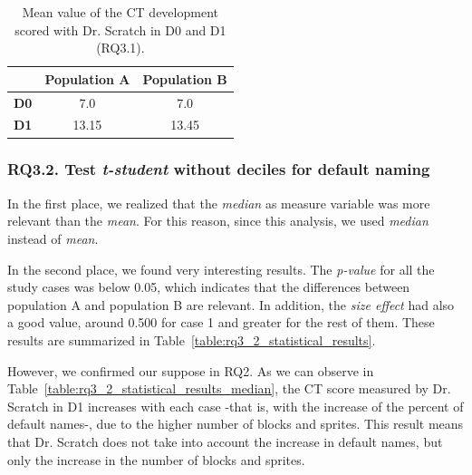 \begin{table}
 \begin{center}
  \begin{tabular}{|c|c|c|}
    \hline
     & \textbf{Population A} & \textbf{Population B} \\ \hline
    \textbf{D0} & 7.0 & 7.0 \\ \hline
    \textbf{D1} & 13.15 & 13.45 \\ \hline
  \end{tabular}
  \caption{Mean value of the CT development scored with Dr. Scratch in D0 and D1 (RQ3.1).}
  \label{table:rq3_1_statistical_results_mean}
 \end{center}
\end{table}



\subsubsection{RQ3.2. Test \textit{t-student} without deciles for default naming}
\label{subsubsec:RQ3_2_statistical_results}

In the first place, we realized that the \textit{median} as measure variable was more relevant than the \textit{mean}. For this reason, since this analysis, we used \textit{median} instead of \textit{mean}. 

In the second place, we found very interesting results. The \textit{p-value} for all the study cases was below 0.05, which indicates that the differences between population A and population B are relevant. In addition, the \textit{size effect} had also a good value, around 0.500 for case 1 and greater for the rest of them. These results are summarized in Table~\ref{table:rq3_2_statistical_results}. 

However, we confirmed our suppose in RQ2. As we can observe in Table~\ref{table:rq3_2_statistical_results_median}, the CT score measured by Dr. Scratch in D1 increases with each case -that is, with the increase of the percent of default names-, due to the higher number of blocks and sprites. This result means that Dr. Scratch does not take into account the increase in default names, but only the increase in the number of blocks and sprites.

